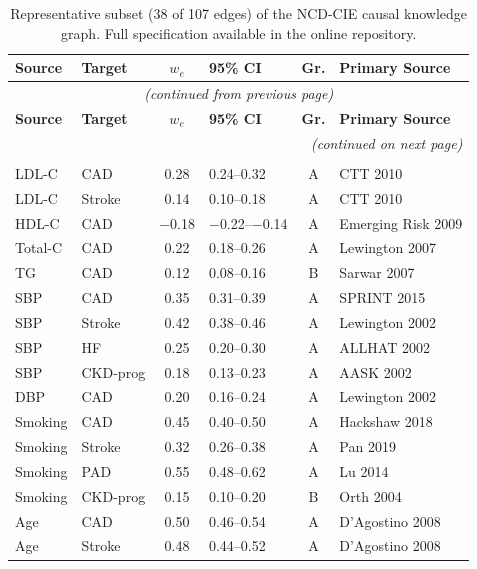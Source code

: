 \documentclass[runningheads]{llncs}
\begin{document}
{\footnotesize
\renewcommand{\arraystretch}{1.05}
\begin{longtable}{@{}p{2.0cm}p{2.0cm}cp{1.4cm}cp{2.8cm}@{}}
\caption{Representative subset (38 of 107 edges) of the NCD-CIE causal knowledge graph. Full specification available in the online repository.}\label{tab:edges}\\
\toprule
\textbf{Source} & \textbf{Target} & \textbf{$w_e$} & \textbf{95\% CI} & \textbf{Gr.} & \textbf{Primary Source} \\
\midrule
\endfirsthead
\multicolumn{6}{c}{\small\itshape (continued from previous page)} \\
\toprule
\textbf{Source} & \textbf{Target} & \textbf{$w_e$} & \textbf{95\% CI} & \textbf{Gr.} & \textbf{Primary Source} \\
\midrule
\endhead
\midrule
\multicolumn{6}{r}{\small\itshape (continued on next page)} \\
\endfoot
\bottomrule
\endlastfoot
\multicolumn{6}{l}{\textbf{CVD Domain (38 edges)}} \\
\midrule
LDL-C & CAD & 0.28 & 0.24--0.32 & A & CTT 2010 \\
LDL-C & Stroke & 0.14 & 0.10--0.18 & A & CTT 2010 \\
HDL-C & CAD & $-$0.18 & $-$0.22--$-$0.14 & A & Emerging Risk 2009 \\
Total-C & CAD & 0.22 & 0.18--0.26 & A & Lewington 2007 \\
TG & CAD & 0.12 & 0.08--0.16 & B & Sarwar 2007 \\
SBP & CAD & 0.35 & 0.31--0.39 & A & SPRINT 2015 \\
SBP & Stroke & 0.42 & 0.38--0.46 & A & Lewington 2002 \\
SBP & HF & 0.25 & 0.20--0.30 & A & ALLHAT 2002 \\
SBP & CKD-prog & 0.18 & 0.13--0.23 & A & AASK 2002 \\
DBP & CAD & 0.20 & 0.16--0.24 & A & Lewington 2002 \\
Smoking & CAD & 0.45 & 0.40--0.50 & A & Hackshaw 2018 \\
Smoking & Stroke & 0.32 & 0.26--0.38 & A & Pan 2019 \\
Smoking & PAD & 0.55 & 0.48--0.62 & A & Lu 2014 \\
Smoking & CKD-prog & 0.15 & 0.10--0.20 & B & Orth 2004 \\
Age & CAD & 0.50 & 0.46--0.54 & A & D'Agostino 2008 \\
Age & Stroke & 0.48 & 0.44--0.52 & A & D'Agostino 2008 \\

\end{longtable}}
\end{document}
